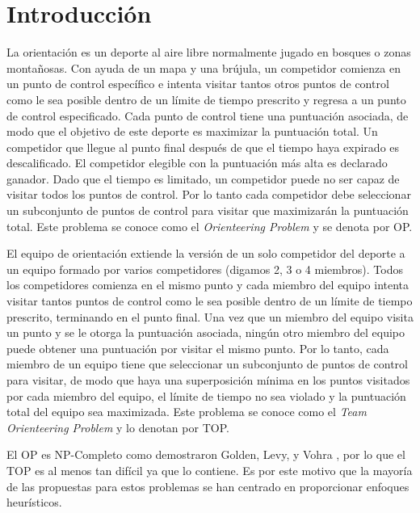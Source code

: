 \chapter{Introducción}

La orientación es un deporte al aire libre normalmente jugado en bosques o zonas montañosas. Con ayuda de un mapa y una brújula, un competidor comienza en un punto de control específico e intenta visitar tantos otros puntos de control como le sea posible dentro de un límite de tiempo prescrito y regresa a un punto de control especificado. Cada punto de control tiene una puntuación asociada, de modo que el objetivo de este deporte es maximizar la puntuación total. Un competidor que llegue al punto final después de que el tiempo haya expirado es descalificado. El competidor elegible con la puntuación más alta es declarado ganador. Dado que el tiempo es limitado, un competidor puede no ser capaz de visitar todos los puntos de control. Por lo tanto cada competidor debe seleccionar un subconjunto de puntos de control para visitar que maximizarán la puntuación total. Este problema se conoce como el \textit{Orienteering Problem} y se denota por OP.

\bigskip

El equipo de orientación extiende la versión de un solo competidor del deporte a un equipo formado por varios competidores (digamos 2, 3 o 4 miembros). Todos los competidores comienza en el mismo punto y cada miembro del equipo intenta visitar tantos puntos de control como le sea posible dentro de un límite de tiempo prescrito, terminando en el punto final. Una vez que un miembro del equipo visita un punto y se le otorga la puntuación asociada, ningún otro miembro del equipo puede obtener una puntuación por visitar el mismo punto. Por lo tanto, cada miembro de un equipo tiene que seleccionar un subconjunto de puntos de control para visitar, de modo que haya una superposición mínima en los puntos visitados por cada miembro del equipo, el límite de tiempo no sea violado y la puntuación total del equipo sea maximizada. Este problema se conoce como el \textit{Team Orienteering Problem} y lo denotan por TOP.

\bigskip

El OP es NP-Completo como demostraron Golden, Levy, y Vohra \cite{GoldenLevyVohra}, por lo que el TOP es al menos tan difícil ya que lo contiene. Es por este motivo que la mayoría de las propuestas para estos problemas se han centrado en proporcionar enfoques heurísticos.

\bigskip

